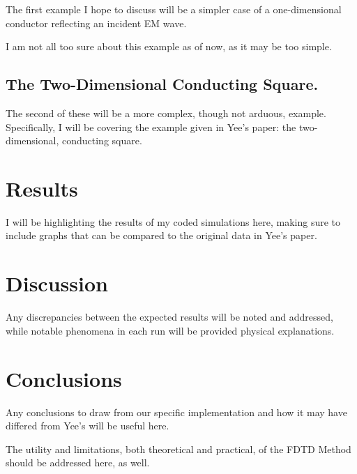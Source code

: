 \documentclass[reprint,preprintnumbers,amsmath,amssymb,aps,nofootinbib,showkeys]{revtex4-2}
\begin{document}
    The first example I hope to discuss will be a simpler case of a one-dimensional conductor reflecting an incident EM wave.

    I am not all too sure about this example as of now, as it may be too simple.

\subsection{The Two-Dimensional Conducting Square.}

    The second of these will be a more complex, though not arduous, example. Specifically, I will be covering the example given in Yee's paper: the two-dimensional, conducting square.


\section{Results}\label{results}

    I will be highlighting the results of my coded simulations here, making sure to include graphs that can be compared to the original data in Yee's paper. 


\section{Discussion}\label{discussion}

    Any discrepancies between the expected results will be noted and addressed, while notable phenomena in each run will be provided physical explanations.
    

\section{Conclusions}\label{conclusions}

     Any conclusions to draw from our specific implementation and how it may have differed from Yee's will be useful here.
     
     The utility and limitations, both theoretical and practical, of the FDTD Method should be addressed here, as well.

\end{document}
